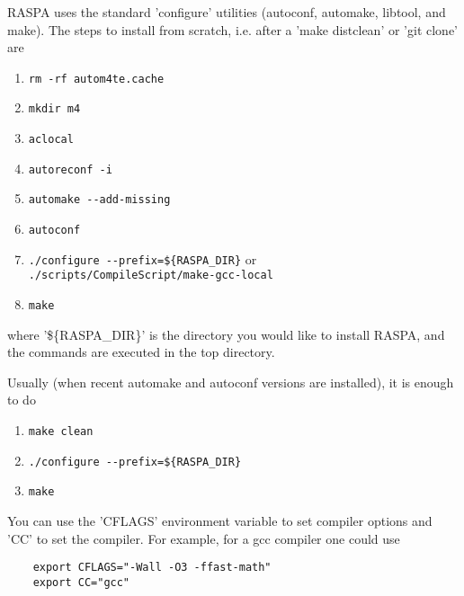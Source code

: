 RASPA uses the standard 'configure' utilities (autoconf, automake, libtool, and make).
The steps to install from scratch, i.e. after a 'make distclean' or 'git clone' are
\begin{enumerate}
 \item{\verb=rm -rf autom4te.cache=}
 \item{\verb=mkdir m4=}
 \item{\verb=aclocal=}
 \item{\verb=autoreconf -i=}
 \item{\verb=automake --add-missing=}
 \item{\verb=autoconf=}
 \item{\verb,./configure --prefix=${RASPA_DIR},  \qquad or\\
       \verb=./scripts/CompileScript/make-gcc-local=}
 \item{\verb=make=}
\end{enumerate}
where '\$\{RASPA\_DIR\}' is the directory you would like to install RASPA, and the commands
are executed in the top directory.

Usually (when recent automake and autoconf versions are installed), it is enough to do
\begin{enumerate}
  \item{\verb=make clean=}
  \item{\verb,./configure --prefix=${RASPA_DIR},}
  \item{\verb=make=}
\end{enumerate}

You can use the 'CFLAGS' environment variable to set compiler options and 'CC' to set the compiler.
For example, for a gcc compiler one could use
\begin{verbatim}
    export CFLAGS="-Wall -O3 -ffast-math"
    export CC="gcc"
\end{verbatim}

